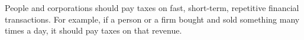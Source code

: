 People and corporations should pay taxes on fast, short-term, repetitive financial transactions.
For example, if a person or a firm bought and sold something many times a day, it should pay taxes on that revenue.